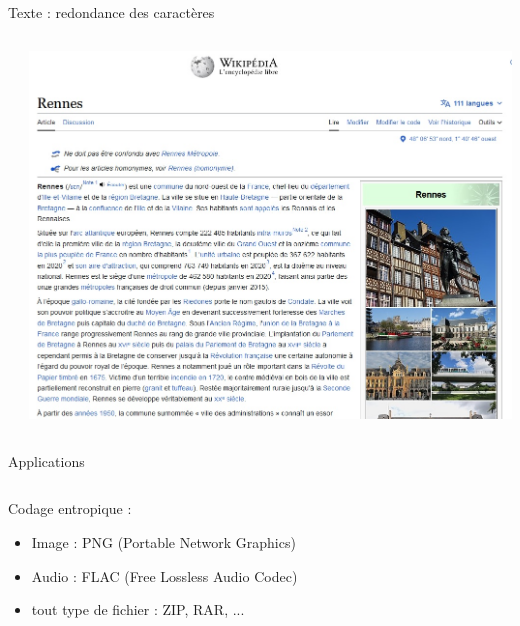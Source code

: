 \documentclass[9pt, aspectratio=169]{beamer}
\begin{document}
\begin{frame}{Texte : redondance des caractères}
\begin{columns}
\begin{column}{0.6\textwidth}
   \end{column}
   \begin{column}{0.39\textwidth}
		\includegraphics[width=\textwidth]{fig/wiki_rennes.jpg}
   \end{column}
\end{columns}
\end{frame}

\begin{frame}{Applications} %
\begin{columns}
   \begin{column}{0.6\textwidth}
		Codage entropique :
        \begin{itemize}
            \item Image : PNG (Portable Network Graphics)
            \item Audio : FLAC (Free Lossless Audio Codec)
            \item tout type de fichier : ZIP, RAR, ...
        \end{itemize}
        
   \end{column}
   \begin{column}{0.39\textwidth}
		
   \end{column}
\end{columns}
\end{frame}
\end{document}
